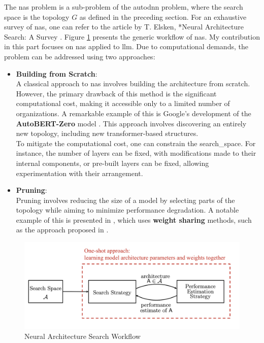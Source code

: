 The \acrshort{nas} problem is a sub-problem of the \acrshort{autodnn} problem, where the search space is the topology \( G \) as defined in the preceding section. For an exhaustive survey of \acrshort{nas}, one can refer to the article by T. Elsken, *Neural Architecture Search: A Survey \cite{elsken_neural_2019}. Figure \ref{fig:nas} presents the generic workflow of \acrshort{nas}. My contribution in this part focuses on \acrshort{nas} applied to \acrshort{llm}. Due to computational demands, the problem can be addressed using two approaches:

\begin{itemize}
    

    \item \textbf{Building from Scratch}:\\
    A classical approach to \acrshort{nas} involves building the architecture from scratch. However, the primary drawback of this method is the significant computational cost, making it accessible only to a limited number of organizations. A remarkable example of this is Google's development of the \textbf{AutoBERT-Zero} model \cite{gao_autobert-zero_2022}. This approach involves discovering an entirely new topology, including new transformer-based structures.\\
    To mitigate the computational cost, one can constrain the \gls{search_space}. For instance, the number of layers can be fixed, with modifications made to their internal components, or pre-built layers can be fixed, allowing experimentation with their arrangement.

    \item \textbf{Pruning}:\\
    Pruning involves reducing the size of a model by selecting parts of the topology while aiming to minimize performance degradation. A notable example of this is presented in \cite{klein_structural_2023}, which uses \textbf{weight sharing} methods, such as the approach proposed in \cite{pham_efficient_2018}.
\end{itemize}

\begin{figure}
    \centering
    \includegraphics[width=0.6\linewidth]{assets/img/chap_2/NAS-high-level.png}
    \caption{Neural Architecture Search Workflow}
    \label{fig:nas}
\end{figure}

